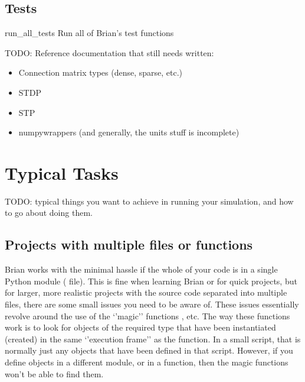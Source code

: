 \documentclass[letterpaper,10pt]{manual}
\begin{document}
\resetcurrentobjects
{}

\hypertarget{index-94}{}\section{Tests}


\hypertarget{brian.run_all_tests}{}\begin{funcdesc}{run\_all\_tests}{}
Run all of Brian's test functions
\end{funcdesc}

TODO: Reference documentation that still needs written:
\begin{itemize}
\item {} 
Connection matrix types (dense, sparse, etc.)

\item {} 
STDP

\item {} 
STP

\item {} 
numpywrappers (and generally, the units stuff is incomplete)

\end{itemize}

\resetcurrentobjects


\chapter{Typical Tasks}

TODO: typical things you want to achieve in running your simulation,
and how to go about doing them.

\resetcurrentobjects
{}

\hypertarget{projects-with-multiple-files}{}\section{Projects with multiple files or functions}

Brian works with the minimal hassle if the whole of your code is in a
single Python module ( file). This is fine when learning Brian
or for quick projects, but for larger, more realistic projects with
the source code separated into multiple files, there are some small
issues you need to be aware of. These issues essentially revolve
around the use of the `'magic'' functions \hyperlink{brian.run}{}, etc. The way
these functions work is to look for objects of the required type that
have been instantiated (created) in the same `'execution frame'' as
the \hyperlink{brian.run}{} function. In a small script, that is normally just
any objects that have been defined in that script. However, if you
define objects in a different module, or in a function, then the
magic functions won't be able to find them.
\end{document}
